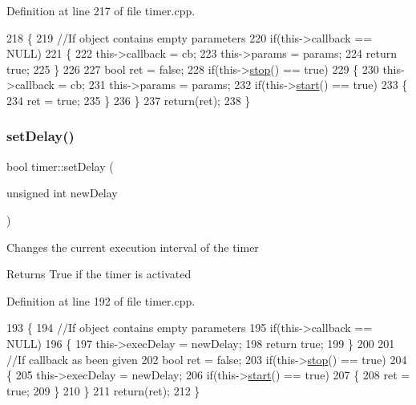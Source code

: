 Definition at line 217 of file timer.\+cpp.


\begin{DoxyCode}
218 \{
219     \textcolor{comment}{//If object contains empty parameters}
220     \textcolor{keywordflow}{if}(this->callback == NULL)
221     \{
222         this->callback = cb;
223         this->params = params;
224         \textcolor{keywordflow}{return} \textcolor{keyword}{true};
225     \}
226 
227     \textcolor{keywordtype}{bool} ret = \textcolor{keyword}{false};
228     \textcolor{keywordflow}{if}(this->\hyperlink{classtimer_ad21a0c9113d870f8485b775f1fcd3c73}{stop}() == \textcolor{keyword}{true})
229     \{
230         this->callback = cb;
231         this->params = params;
232         \textcolor{keywordflow}{if}(this->\hyperlink{classtimer_adad85b4705278d4cb8a2a4f3286cc2c7}{start}() == \textcolor{keyword}{true})
233         \{
234             ret = \textcolor{keyword}{true};
235         \}
236     \}
237     \textcolor{keywordflow}{return}(ret);
238 \}
\end{DoxyCode}
\mbox{\label{classtimer_acd8ddd948bf96185cf3c1e0a4cf60264}} 
\subsubsection{\texorpdfstring{set\+Delay()}{setDelay()}}
{\footnotesize\ttfamily bool timer\+::set\+Delay (\begin{DoxyParamCaption}\item[{unsigned int}]{new\+Delay }\end{DoxyParamCaption})}

Changes the current execution interval of the timer \begin{DoxyReturn}{Returns}
True if the timer is activated 
\end{DoxyReturn}


Definition at line 192 of file timer.\+cpp.


\begin{DoxyCode}
193 \{
194     \textcolor{comment}{//If object contains empty parameters}
195     \textcolor{keywordflow}{if}(this->callback == NULL)
196     \{
197         this->execDelay = newDelay;
198         \textcolor{keywordflow}{return} \textcolor{keyword}{true};
199     \}
200 
201     \textcolor{comment}{//If callback as been given}
202     \textcolor{keywordtype}{bool} ret = \textcolor{keyword}{false};
203     \textcolor{keywordflow}{if}(this->\hyperlink{classtimer_ad21a0c9113d870f8485b775f1fcd3c73}{stop}() == \textcolor{keyword}{true})
204     \{
205         this->execDelay = newDelay;
206         \textcolor{keywordflow}{if}(this->\hyperlink{classtimer_adad85b4705278d4cb8a2a4f3286cc2c7}{start}() == \textcolor{keyword}{true})
207         \{
208             ret = \textcolor{keyword}{true};
209         \}
210     \}
211     \textcolor{keywordflow}{return}(ret);
212 \}
\end{DoxyCode}
\mbox{\label{classtimer_ae3dce84bbcd9a7022a20e2b63174aa61}} 
